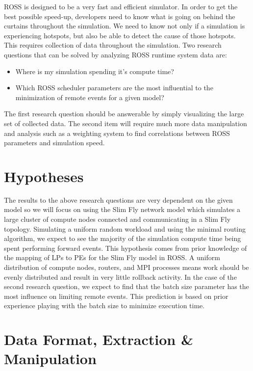 \documentclass[12pt]{article}
\begin{document}
ROSS is designed to be a very fast and efficient simulator. In order to get the best possible speed-up, developers need to know what is going on behind the curtains throughout the simulation. We need to know not only if a simulation is experiencing hotspots, but also be able to detect the cause of those hotspots. This requires collection of data throughout the simulation. Two research questions that can be solved by analyzing ROSS runtime system data are:

\begin{itemize}
  \item Where is my simulation spending it's compute time?
  \item Which ROSS scheduler parameters are the most influential to the minimization of remote events for a given model?
\end{itemize}

The first research question should be answerable by simply visualizing the large set of collected data. 
The second item will require much more data manipulation and analysis such as a weighting system to find correlations between ROSS parameters and simulation speed.

\section{Hypotheses}

The results to the above research questions are very dependent on the given model so we will focus on using the Slim Fly network model which simulates a large cluster of compute nodes connected and communicating in a Slim Fly topology. Simulating a uniform random workload and using the minimal routing algorithm, we expect to see the majority of the simulation compute time being spent performing forward events. This hypothesis comes from prior knowledge of the mapping of LPs to PEs for the Slim Fly model in ROSS. A uniform distribution of compute nodes, routers, and MPI processes means work should be evenly distributed and result in very little rollback activity. In the case of the second research question, we expect to find that the batch size parameter has the most influence on limiting remote events. This prediction is based on prior experience playing with the batch size to minimize execution time.

\section{Data Format, Extraction \& Manipulation}
\end{document}
